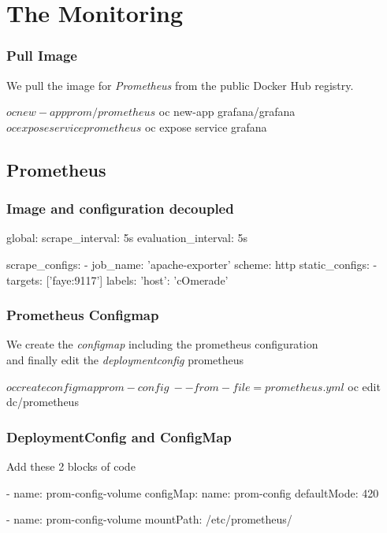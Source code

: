 
\section{The Monitoring}

\begin{frame}[fragile]
  \frametitle{Pull Image}
  We pull the image for \emph{Prometheus} from the public Docker Hub registry.
  \begin{bashcode}
    $ oc new-app prom/prometheus
    $ oc new-app grafana/grafana
    $ oc expose service prometheus
    $ oc expose service grafana
  \end{bashcode}
\end{frame}

\subsection{Prometheus}

\begin{frame}[fragile]
  \frametitle{Image and configuration decoupled}
  \begin{yamlcode}
    global:
      scrape_interval:     5s 
      evaluation_interval: 5s 

    scrape_configs:
      - job_name: 'apache-exporter'
        scheme: http
        static_configs:
        - targets: ['faye:9117']
          labels: {'host': 'cOmerade'}

  \end{yamlcode}
\end{frame}

\begin{frame}[fragile]
  \frametitle{Prometheus Configmap}
  We create the \emph{configmap} including the prometheus configuration \\
  and finally edit the \emph{deploymentconfig} prometheus
  \begin{bashcode}
    $ oc create configmap prom-config \
    --from-file=prometheus.yml
    $ oc edit dc/prometheus
  \end{bashcode}
\end{frame}

\begin{frame}[fragile]
  \frametitle{DeploymentConfig and ConfigMap}
  Add these 2 blocks of code
  \begin{yamlcode}
    - name: prom-config-volume
      configMap:
        name: prom-config
        defaultMode: 420
  \end{yamlcode}

  \begin{yamlcode}
    - name: prom-config-volume
      mountPath: /etc/prometheus/
  \end{yamlcode}
\end{frame}
  

